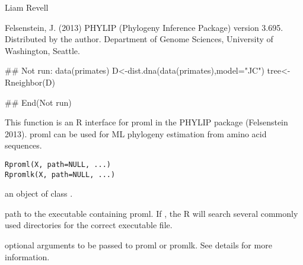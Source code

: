 \documentclass[a4paper]{book}
\begin{document}
%
\begin{Author}\relax
Liam Revell 
\end{Author}
%
\begin{References}\relax
Felsenstein, J. (2013) PHYLIP (Phylogeny Inference Package) version 3.695. Distributed by the author. Department of Genome Sciences, University of Washington, Seattle.
\end{References}
%
\begin{SeeAlso}\relax
{}
\end{SeeAlso}
%
\begin{Examples}
\begin{ExampleCode}
## Not run: 
data(primates)
D<-dist.dna(data(primates),model="JC")
tree<-Rneighbor(D)

## End(Not run)
\end{ExampleCode}
\end{Examples}
%
\begin{Description}\relax
This function is an R interface for proml in the PHYLIP package (Felsenstein 2013). proml can be used for ML phylogeny estimation from amino acid sequences.
\end{Description}
%
\begin{Usage}
\begin{verbatim}
Rproml(X, path=NULL, ...)
Rpromlk(X, path=NULL, ...)
\end{verbatim}
\end{Usage}
%
\begin{Arguments}
\begin{ldescription}
\item[\code{X}] an object of class .
\item[\code{path}] path to the executable containing proml. If , the R will search several commonly used directories for the correct executable file.
\item[\code{...}] optional arguments to be passed to proml or promlk. See details for more information.
\end{ldescription}
\end{Arguments}
%
\end{document}
